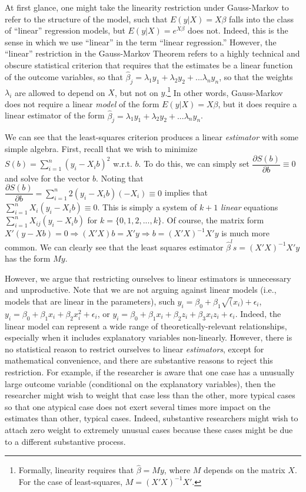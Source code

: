 \documentclass[10pt]{article}
\begin{document}
At first glance, one might take the linearity restriction under Gauss-Markov to refer to the structure of the model, such that $E(y | X) = X\beta$ falls into the class of ``linear'' regression models, but  $E(y | X) = e^{X\beta}$ does not. Indeed, this is the sense in which we use ``linear'' in the term ``linear regression.'' However, the ``linear'' restriction in the Gauss-Markov Theorem refers to a highly technical and obscure statistical criterion that requires that the estimates be a linear function of the outcome variables, so that $\hat{\beta}_j = \lambda_1 y_1 + \lambda_2 y_2 + ... \lambda_n y_n$, so that the weights $\lambda_i$ are allowed to depend on $X$, but not on $y$.\footnote{Formally, linearity requires that $\hat{\beta} = My$, where $M$ depends on the matrix $X$. For the case of least-squares, $M = (X'X)^{-1}X'$.} In other words, Gauss-Markov does not require a linear \textit{model} of the form $E(y | X) = X\beta$, but it does require a linear estimator of the form $\hat{\beta}_j = \lambda_1 y_1 + \lambda_2 y_2 + ... \lambda_n y_n$. 

We can see that the least-squares criterion produces a linear \textit{estimator} with some simple algebra. First, recall that we wish to minimize $S(b) = \sum_{i = 1}^n(y_i - X_ib)^2$ w.r.t. $b$. To do this, we can simply set $\dfrac{\partial S(b)}{\partial b} \equiv 0$ and solve for the vector $b$. Noting that $\dfrac{\partial S(b)}{\partial b} = \sum_{i = 1}^n 2(y_i - X_ib)(-X_i) \equiv 0$ implies that $\sum_{i = 1}^n X_i(y_i - X_ib) \equiv 0$. This is simply a system of $k+1$ \textit{linear} equations $\sum_{i = 1}^n X_{ij}(y_i - X_ib)$ for $k = \{0, 1, 2,..., k\}$. Of course, the matrix form $X'(y - Xb) = 0 \Rightarrow (X'X)b = X'y \Rightarrow b = (X'X)^{-1}X'y$ is much more common. We can clearly see that the least squares estimator $\hat{\beta}^ls = (X'X)^{-1}X'y$ has the form $My$.

However, we argue that restricting ourselves to linear estimators is unnecessary and unproductive. Note that we are not arguing against linear models (i.e., models that are linear in the parameters), such $y_i = \beta_0 + \beta_1\sqrt(x_i) + \epsilon_i$, $y_i = \beta_0 + \beta_1x_i + \beta_2x_i^2 + \epsilon_i$,  or $y_i = \beta_0 + \beta_1x_i + \beta_2z_i + \beta_3x_iz_i + \epsilon_i$. Indeed, the linear model can represent a wide range of theoretically-relevant relationships, especially when it includes explanatory variables non-linearly. However, there is no statistical reason to restrict ourselves to linear \textit{estimators}, except for mathematical convenience, and there are substantive reasons to reject this restriction. For example, if the researcher is aware that one case has a unusually large outcome variable (conditional on the explanatory variables), then the researcher might wish to weight that case less than the other, more typical cases so that one atypical case does not exert several times more impact on the estimates than other, typical cases. Indeed, substantive researchers might wish to attach zero weight to extremely unusual cases because these cases might be due to a different substantive process.
\end{document}
